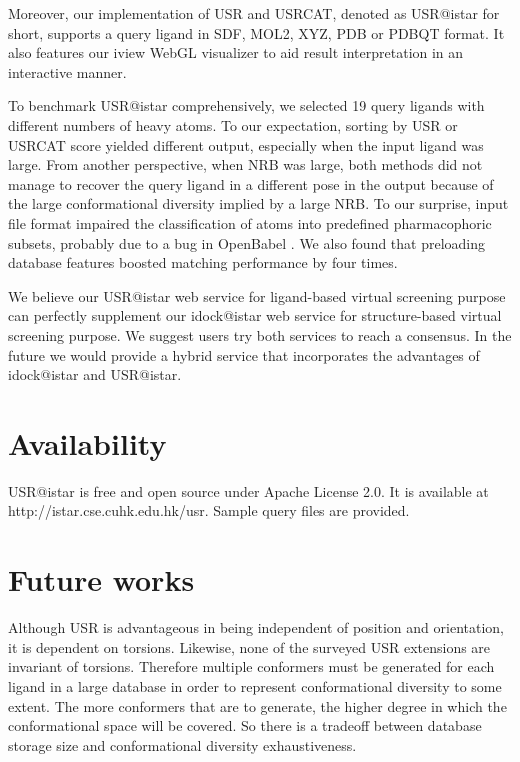 Moreover, our implementation of USR and USRCAT, denoted as USR@istar for short, supports a query ligand in SDF, MOL2, XYZ, PDB or PDBQT format. It also features our iview \citep{1366} WebGL visualizer to aid result interpretation in an interactive manner.

To benchmark USR@istar comprehensively, we selected 19 query ligands with different numbers of heavy atoms. To our expectation, sorting by USR or USRCAT score yielded different output, especially when the input ligand was large. From another perspective, when NRB was large, both methods did not manage to recover the query ligand in a different pose in the output because of the large conformational diversity implied by a large NRB. To our surprise, input file format impaired the classification of atoms into predefined pharmacophoric subsets, probably due to a bug in OpenBabel \citep{968}. We also found that preloading database features boosted matching performance by four times.

We believe our USR@istar web service for ligand-based virtual screening purpose can perfectly supplement our idock@istar web service for structure-based virtual screening purpose. We suggest users try both services to reach a consensus. In the future we would provide a hybrid service that incorporates the advantages of idock@istar and USR@istar.

\section{Availability}

USR@istar is free and open source under Apache License 2.0. It is available at http://istar.cse.cuhk.edu.hk/usr. Sample query files are provided.

\section{Future works}

Although USR is advantageous in being independent of position and orientation, it is dependent on torsions. Likewise, none of the surveyed USR extensions are invariant of torsions. Therefore multiple conformers must be generated for each ligand in a large database in order to represent conformational diversity to some extent. The more conformers that are to generate, the higher degree in which the conformational space will be covered. So there is a tradeoff between database storage size and conformational diversity exhaustiveness.

